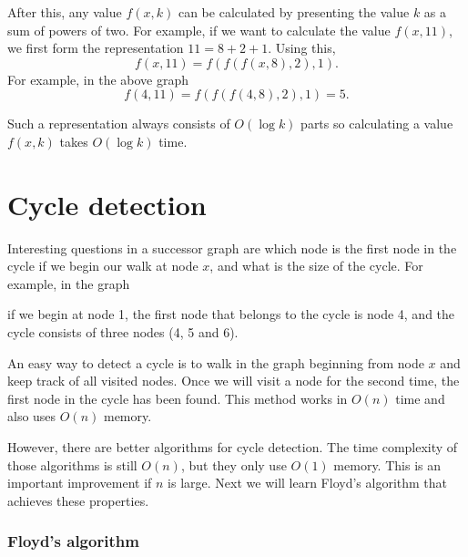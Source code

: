 After this, any value $f(x,k)$ can be calculated
by presenting the value $k$ as a sum of powers of two.
For example, if we want to calculate the value $f(x,11)$,
we first form the representation $11=8+2+1$.
Using this,
\[f(x,11)=f(f(f(x,8),2),1).\]
For example, in the above graph
\[f(4,11)=f(f(f(4,8),2),1)=5.\]

Such a representation always consists of
$O(\log k)$ parts so calculating a value $f(x,k)$
takes $O(\log k)$ time.

\section{Cycle detection}


Interesting questions in a successor graph are
which node is the first node in the cycle
if we begin our walk at node $x$,
and what is the size of the cycle.
For example, in the graph

\begin{center}
\end{center}
if we begin at node 1, the first node that belongs
to the cycle is node 4, and the cycle consists
of three nodes (4, 5 and 6).

An easy way to detect a cycle is to walk in the
graph beginning from node $x$ and keep track of
all visited nodes. Once we will visit a node
for the second time, the first node in the cycle has been found.
This method works in $O(n)$ time and also uses
$O(n)$ memory.

However, there are better algorithms for cycle detection.
The time complexity of those algorithms is still $O(n)$,
but they only use $O(1)$ memory.
This is an important improvement if $n$ is large.
Next we will learn Floyd's algorithm that
achieves these properties.

\subsubsection{Floyd's algorithm}

